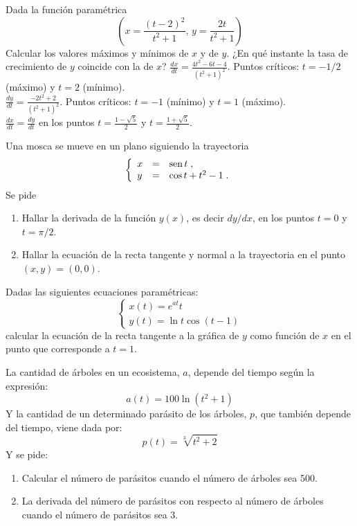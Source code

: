 {Dada la función paramétrica
\[
\left(
    x =\frac{(t-2)^2}{t^2+1},\, y=\dfrac{2t}{t^2+1}
\right)
\]
Calcular los valores máximos y mínimos de $x$ y de $y$. ¿En qué instante la tasa de crecimiento de $y$ coincide con la de $x$?
}
{$\frac{dx}{dt}=\frac{4t^2-6t-4}{(t^2+1)^2}$. Puntos críticos: $t=-1/2$ (máximo) y $t=2$ (mínimo).\\
$\frac{dy}{dt}=\frac{-2t^2+2}{(t^2+1)^2}$. Puntos críticos: $t=-1$ (mínimo) y $t=1$ (máximo).\\
$\frac{dx}{dt}=\frac{dy}{dt}$ en los puntos $t=\frac{1-\sqrt 5}{2}$ y $t=\frac{1+\sqrt 5}{2}$.
}
{
}


{Una mosca se mueve en un plano siguiendo la trayectoria
\[
\left\{
\begin{array}{lll}
x & = & \operatorname{sen} t
\; ,
\\
y & = & \cos t + t^2 - 1
\; .
\end{array}
\right.
\]
Se pide
\begin{enumerate}
\item Hallar la derivada de la función $y(x)$, es decir $dy/dx$,
en los puntos $t=0$ y $t=\pi/2$.
\item Hallar la ecuación de la recta tangente y normal a la trayectoria
en el punto $(x,y)=(0,0)$.
\end{enumerate}
}


{Dadas las siguientes ecuaciones paramétricas:
\[
\left\{
\begin{array}{l}
x(t)=e^{at}t \\
y(t)=\ln t\cos (t-1)
\end{array}
\right.
\] 
calcular la ecuación de la recta tangente a la gráfica de $y$ como función de $x$ en el punto que corresponde a $t=1$.
}


{La cantidad de árboles en un ecosistema, $a$, depende del tiempo según la expresión:
\[
a(t)=100\ln(t^2+1)
\]
Y la cantidad de un determinado parásito de los árboles, $p$, que también depende del tiempo, viene dada por:
\[
p(t) = \sqrt[3]{{t^2  + 2}}
\]
Y se pide:
\begin{enumerate}
\item Calcular el número de parásitos cuando el número de árboles sea 500.
\item La derivada del número de parásitos con respecto al número de árboles cuando el número de parásitos sea 3.
\end{enumerate}
}


